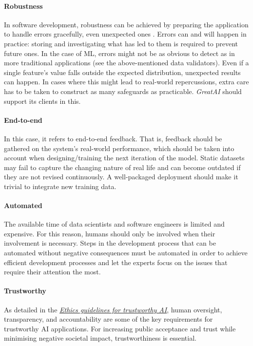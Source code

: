 \paragraph{Robustness} In software development, robustness can be achieved by preparing the application to handle errors gracefully, even unexpected ones \cite{bishop1998robust}. Errors can and will happen in practice: storing and investigating what has led to them is required to prevent future ones. In the case of ML, errors might not be as obvious to detect as in more traditional applications (see the above-mentioned data validators). Even if a single feature's value falls outside the expected distribution, unexpected results can happen. In cases where this might lead to real-world repercussions, extra care has to be taken to construct as many safeguards as practicable. \textit{GreatAI} should support its clients in this.

\paragraph{End-to-end} In this case, it refers to end-to-end feedback. That is, feedback should be gathered on the system's real-world performance, which should be taken into account when designing/training the next iteration of the model. Static datasets may fail to capture the changing nature of real life and can become outdated if they are not revised continuously. A well-packaged deployment should make it trivial to integrate new training data.

\paragraph{Automated} The available time of data scientists and software engineers is limited and expensive. For this reason, humans should only be involved when their involvement is necessary. Steps in the development process that can be automated without negative consequences must be automated in order to achieve efficient development processes and let the experts focus on the issues that require their attention the most.

\paragraph{Trustworthy} As detailed in the \href{https://digital-strategy.ec.europa.eu/en/library/ethics-guidelines-trustworthy-ai}{\textit{Ethics guidelines for trustworthy AI}}, human oversight, transparency, and accountability are some of the key requirements for trustworthy AI applications. For increasing public acceptance and trust while minimising negative societal impact, trustworthiness is essential.

